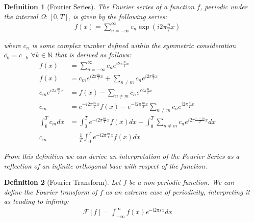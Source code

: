\documentclass[12pt]{article}
\newtheorem{definition}{Definition}
\begin{document}
\begin{definition}[Fourier Series]
    The Fourier series of a function $f$, periodic under the interval $\Omega : [0, T]$, is given by the following series:
    \begin{align*}
        f(x) = \sum_{n = -\infty}^\infty c_n \exp \left( i 2\pi \frac{n}{T} x\right)
    \end{align*}

    where $c_n$ is some complex number defined within the symmetric consideration $\overline{c_k} = c_{-k}$ $ \forall k \in \mathbb{N}$ that is derived as follows:
    \begin{align*}
        f(x) &= \sum_{n = -\infty}^\infty c_n  e^{i 2\pi \frac{n}{T} x} \\
        f(x) &= c_m e^{i 2\pi \frac{m}{T} x} + \sum_{n \neq m} c_n e^{i 2\pi \frac{n}{T} x} \\
        c_m e^{i 2\pi \frac{m}{T} x} &= f(x) - \sum_{n \neq m} c_n e^{i 2\pi \frac{n}{T} x} \\
        c_m &= e^{- i 2\pi \frac{m}{T} x} f(x) - e^{-i 2\pi \frac{m}{T} x} \sum_{n \neq m} c_n e^{i 2\pi \frac{n}{T} x} \\
        \int_0^T c_m dx &= \int_0^Te^{- i 2\pi \frac{m}{T} x} f(x)dx  - \int_0^T \sum_{n \neq m} c_n e^{i 2\pi \frac{n - m}{T} x} dx\\
        c_m &= \frac{1}{T} \int_0^Te^{- i 2\pi \frac{m}{T} x} f(x)dx
    \end{align*}

From this definition we can derive an interpretation of the Fourier Series as a reflection of an infinite orthogonal base with respect of the function.
\end{definition}

\begin{definition}[Fourier Transform]
    Let $f$ be a non-periodic function. We can define the Fourier transform of $f$ as an extreme case of periodicity, interpreting it as tending to infinity:
    \begin{align*}
        \mathcal{F}[f] = \int_{-\infty}^{\infty} f(x) e^{- i 2 \pi s x} dx
    \end{align*}
\end{definition}
\end{document}
